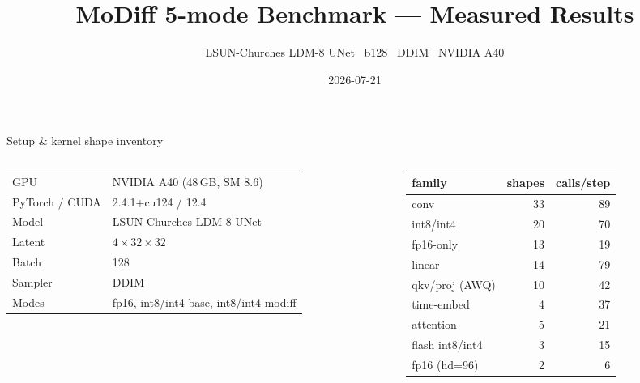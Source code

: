\documentclass[aspectratio=169,10pt]{beamer}
\title[MoDiff 5-mode benchmark]{MoDiff 5-mode Benchmark --- Measured Results}
\subtitle{LSUN-Churches LDM-8 UNet \textbullet\ b128 \textbullet\ DDIM \textbullet\ NVIDIA A40}
\date{2026-07-21}
\begin{document}
\frame{\titlepage}

\begin{frame}{Setup \& kernel shape inventory}
\footnotesize
\begin{columns}[T]
\begin{column}{0.46\textwidth}
\begin{tabular}{@{}ll@{}}
\toprule
GPU & NVIDIA A40 (48\,GB, SM 8.6)\\
PyTorch / CUDA & 2.4.1+cu124 / 12.4\\
Model & LSUN-Churches LDM-8 UNet\\
Latent & $4\times32\times32$\\
Batch & 128\\
Sampler & DDIM\\
Modes & fp16, int8/int4 base, int8/int4 modiff\\
\bottomrule
\end{tabular}
\end{column}
\begin{column}{0.5\textwidth}
\begin{tabular}{@{}lrr@{}}
\toprule
family & shapes & calls/step\\
\midrule
conv & 33 & 89\\
\quad int8/int4 & 20 & 70\\
\quad fp16-only & 13 & 19\\
linear & 14 & 79\\
\quad qkv/proj (AWQ) & 10 & 42\\
\quad time-embed & 4 & 37\\
attention & 5 & 21\\
\quad flash int8/int4 & 3 & 15\\
\quad fp16 (hd=96) & 2 & 6\\
\bottomrule
\end{tabular}
\end{column}
\end{columns}
\end{frame}
\end{document}
